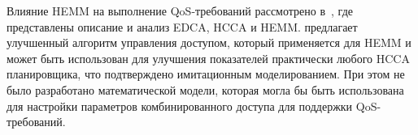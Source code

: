
Влияние HEMM на выполнение QoS-требований рассмотрено в~\cite{ruscelli2012enhancement}, где представлены описание и анализ EDCA, HCCA и HEMM. \cite{ruscelli2012enhancement} предлагает улучшенный алгоритм управления доступом, который применяется для HEMM и может быть использован для улучшения показателей практически любого HCCA планировщика, что подтверждено имитационным моделированием. При этом не было разработано математической модели, которая могла бы быть использована для настройки параметров комбинированного доступа для поддержки QoS-требований.  

